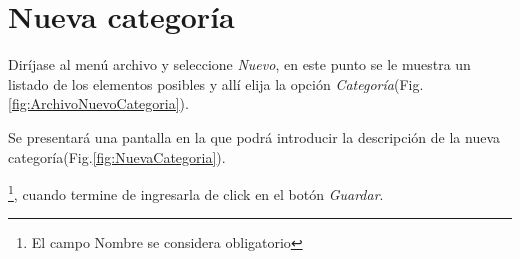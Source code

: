 \section{Nueva categor\'ia}
\label{sec:nuevaCategoria}
Dir\'ijase al men\'u archivo y seleccione \emph{Nuevo}, en este punto se le muestra un listado de los elementos posibles y
all\'i elija la opci\'on \emph{Categor\'ia}(Fig.\ref{fig:ArchivoNuevoCategoria}). 
  

Se presentar\'a una pantalla en la que podr\'a introducir la descripci\'on de la
nueva categor\'ia(Fig.\ref{fig:NuevaCategoria}). 
  
\footnote{El campo Nombre se considera obligatorio},
cuando termine de ingresarla de click en el bot\'on \emph{Guardar}.